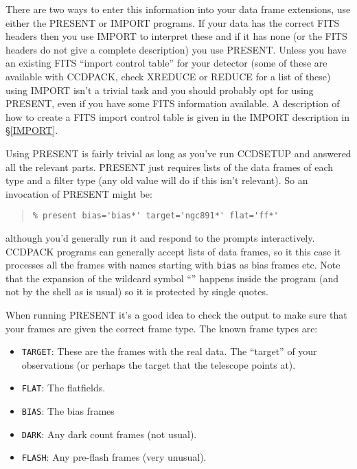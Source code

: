 \documentclass[twoside,11pt]{article}
\newcommand{\hyperref}[4]{#2\ref{#4}#3}
\newcommand{\htmlref}[2]{#1}
\renewcommand{\_}{\texttt{\symbol{95}}}
\newenvironment{myquote}{\begin{quote}\begin{small}}{\end{small}\end{quote}}
\newcommand{\text}[1]{{\small \tt #1}}
\newcommand{\routine}[1]{{\sc #1}}
\newcommand{\xroutine}[1]{\htmlref{{\sc #1}}{#1}}
\begin{document}
There are two ways to enter this information into your data frame
extensions, use either the \xroutine{PRESENT} or \xroutine{IMPORT} programs.
If your data has the correct FITS headers then you use \routine{IMPORT}
to interpret these and if it has none (or the FITS headers do not
give a complete description) you use \routine{PRESENT}. Unless you have
an existing FITS ``import control table'' for your detector (some of these
are available with CCDPACK, check \xroutine{XREDUCE} or \xroutine{REDUCE}
 for a list of these) using \routine{IMPORT}
isn't a trivial task and you should probably opt for using
\routine{PRESENT}, even if you have some FITS information available.
A description of how to create a FITS import control table is given in
the \routine{IMPORT} \hyperref{description}{description in \S}{}{IMPORT}.

Using \routine{PRESENT} is fairly trivial as long as you've
run \routine{CCDSETUP} and answered all the relevant parts.
\routine{PRESENT} just requires lists of the
data frames of each type and a filter type (any old value will do if this
isn't relevant). So an invocation of \routine{PRESENT} might be:
\begin{myquote}
\begin{verbatim}
% present bias='bias*' target='ngc891*' flat='ff*'
\end{verbatim}
\end{myquote}
although you'd generally run it and respond to the prompts
interactively. CCDPACK programs can generally accept lists of data
frames, so it this case it processes all the frames with names
starting with \text{bias} as bias frames etc. Note that the
expansion of the wildcard symbol ``\text{*}'' happens inside the program
(and not by the shell as is usual) so it is protected by single quotes.

When running \routine{PRESENT} it's a good idea to check the output to
make sure that your frames are given the correct frame type. The known frame
types are:
\begin{itemize}
\item \text{TARGET}: These are the frames with the real data. The
``target'' of your observations (or perhaps the target that the
telescope points at).
\item \text{FLAT}: The flatfields.
\item \text{BIAS}: The bias frames
\item \text{DARK}: Any dark count frames (not usual).
\item \text{FLASH}: Any pre-flash frames (very unusual).
\end{itemize}
\end{document}
